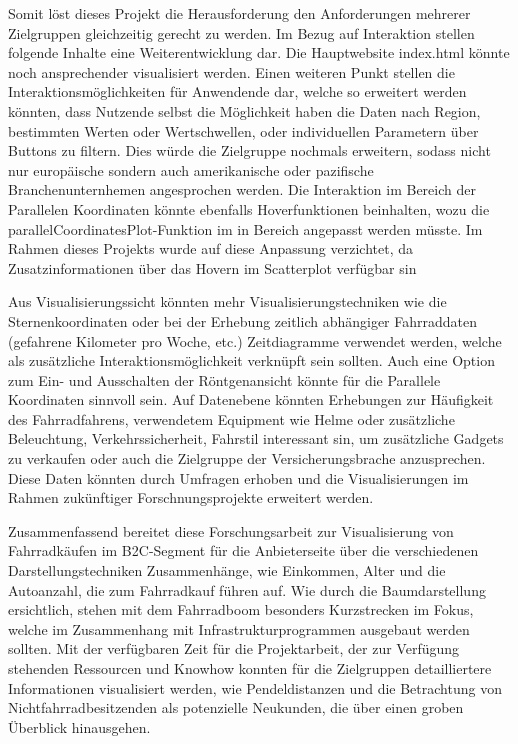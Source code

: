 \documentclass[usegeometry=true]{scrartcl}
\begin{document}
Somit löst dieses Projekt die Herausforderung den Anforderungen mehrerer Zielgruppen gleichzeitig gerecht zu werden.   
Im Bezug auf Interaktion stellen folgende Inhalte eine Weiterentwicklung dar. Die Hauptwebsite index.html könnte noch ansprechender visualisiert werden. Einen weiteren Punkt stellen die Interaktionsmöglichkeiten für Anwendende dar, welche so erweitert werden könnten, dass Nutzende selbst die Möglichkeit haben die Daten nach Region, bestimmten Werten oder Wertschwellen, oder individuellen Parametern über Buttons zu filtern. Dies würde die Zielgruppe nochmals erweitern, sodass nicht nur europäische sondern auch amerikanische oder pazifische Branchenunternhemen angesprochen werden. Die Interaktion im Bereich der Parallelen Koordinaten könnte ebenfalls Hoverfunktionen beinhalten, wozu die parallelCoordinatesPlot-Funktion im in Bereich angepasst werden müsste. Im Rahmen dieses Projekts wurde auf diese Anpassung verzichtet, da Zusatzinformationen über das Hovern im Scatterplot verfügbar sin 

Aus Visualisierungssicht könnten mehr Visualisierungstechniken wie die Sternenkoordinaten oder bei der Erhebung zeitlich abhängiger Fahrraddaten (gefahrene Kilometer pro Woche, etc.) Zeitdiagramme verwendet werden, welche als zusätzliche Interaktionsmöglichkeit verknüpft sein sollten. Auch eine Option zum Ein- und Ausschalten der Röntgenansicht könnte für die Parallele Koordinaten sinnvoll sein. 
Auf Datenebene könnten Erhebungen zur Häufigkeit des Fahrradfahrens, verwendetem Equipment wie Helme oder zusätzliche Beleuchtung, Verkehrssicherheit, Fahrstil interessant sin, um zusätzliche Gadgets zu verkaufen oder auch die Zielgruppe der Versicherungsbrache anzusprechen. Diese Daten könnten durch Umfragen erhoben und die Visualisierungen im Rahmen zukünftiger Forschnungsprojekte erweitert werden.  

Zusammenfassend bereitet diese Forschungsarbeit zur Visualisierung von Fahrradkäufen im B2C-Segment für die Anbieterseite über die verschiedenen Darstellungstechniken Zusammenhänge, wie Einkommen, Alter und die Autoanzahl, die zum Fahrradkauf führen auf. Wie durch die Baumdarstellung ersichtlich, stehen mit dem Fahrradboom besonders Kurzstrecken im Fokus, welche im Zusammenhang mit Infrastrukturprogrammen ausgebaut werden sollten. 
Mit der verfügbaren Zeit für die Projektarbeit, der zur Verfügung stehenden Ressourcen und Knowhow konnten für die Zielgruppen detailliertere Informationen visualisiert werden, wie Pendeldistanzen und die Betrachtung von Nichtfahrradbesitzenden als potenzielle Neukunden, die über einen groben Überblick hinausgehen.   
\end{document}

